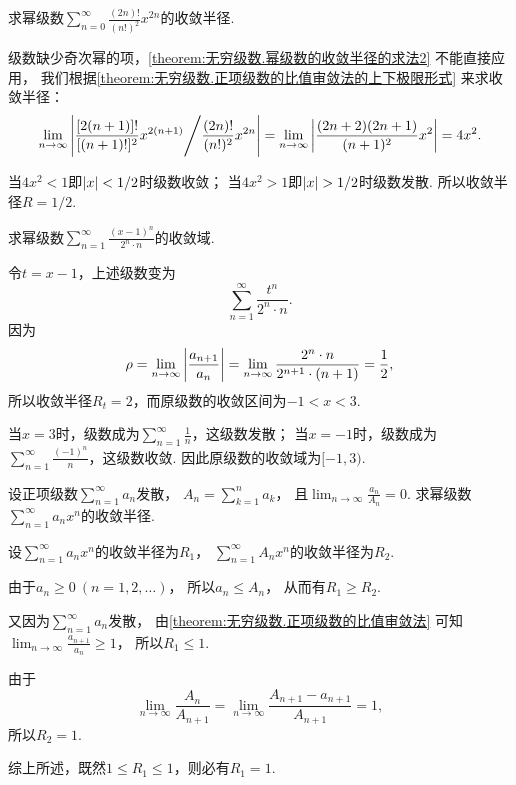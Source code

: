 \begin{example}
求幂级数\(\sum_{n=0}^\infty \frac{(2n)!}{(n!)^2} x^{2n}\)的收敛半径.
\begin{solution}
级数缺少奇次幂的项，\cref{theorem:无穷级数.幂级数的收敛半径的求法2} 不能直接应用，
我们根据\cref{theorem:无穷级数.正项级数的比值审敛法的上下极限形式} 来求收敛半径：
\begin{equation*}
	\lim_{n\to\infty} \abs{
		{\frac{[2(n+1)]!}{[(n+1)!]^2} x^{2(n+1)}}
		\Bigg/
		{\frac{(2n)!}{(n!)^2} x^{2n}}
	}
	= \lim_{n\to\infty} \abs{\frac{(2n+2)(2n+1)}{(n+1)^2} x^2}
	= 4 x^2.
\end{equation*}

当\(4 x^2 < 1\)即\(\abs{x} < 1/2\)时级数收敛；
当\(4 x^2 > 1\)即\(\abs{x} > 1/2\)时级数发散.
所以收敛半径\(R = 1/2\).
\end{solution}
\end{example}

\begin{example}
求幂级数\(\sum_{n=1}^\infty \frac{(x-1)^n}{2^n \cdot n}\)的收敛域.
\begin{solution}
令\(t = x-1\)，上述级数变为\begin{equation*}
	\sum_{n=1}^\infty \frac{t^n}{2^n \cdot n}.
\end{equation*}
因为\begin{equation*}
	\rho
	= \lim_{n\to\infty} \abs{\frac{a_{n+1}}{a_n}}
	= \lim_{n\to\infty} \frac{2^n \cdot n}{2^{n+1} \cdot (n+1)}
	= \frac{1}{2},
\end{equation*}
所以收敛半径\(R_t = 2\)，而原级数的收敛区间为\(-1<x<3\).

当\(x=3\)时，级数成为\(\sum_{n=1}^\infty \frac{1}{n}\)，这级数发散；
当\(x=-1\)时，级数成为\(\sum_{n=1}^\infty \frac{(-1)^n}{n}\)，这级数收敛.
因此原级数的收敛域为\([-1,3)\).
\end{solution}
\end{example}

\begin{example}
设正项级数\(\sum_{n=1}^\infty a_n\)发散，
\(A_n = \sum_{k=1}^n a_k\)，
且\(\lim_{n\to\infty} \frac{a_n}{A_n} = 0\).
求幂级数\(\sum_{n=1}^\infty a_n x^n\)的收敛半径.
\begin{solution}
设\(\sum_{n=1}^\infty a_n x^n\)的收敛半径为\(R_1\)，
\(\sum_{n=1}^\infty A_n x^n\)的收敛半径为\(R_2\).

由于\(a_n\geq0\ (n=1,2,\dotsc)\)，
所以\(a_n \leq A_n\)，
从而有\(R_1 \geq R_2\).

又因为\(\sum_{n=1}^\infty a_n\)发散，
由\cref{theorem:无穷级数.正项级数的比值审敛法} 可知
\(\lim_{n\to\infty} \frac{a_{n+1}}{a_n} \geq 1\)，
所以\(R_1 \leq 1\).

由于\begin{equation*}
	\lim_{n\to\infty} \frac{A_n}{A_{n+1}}
	= \lim_{n\to\infty} \frac{A_{n+1} - a_{n+1}}{A_{n+1}}
	= 1,
\end{equation*}
所以\(R_2=1\).

综上所述，既然\(1 \leq R_1 \leq 1\)，则必有\(R_1=1\).
\end{solution}
\end{example}

